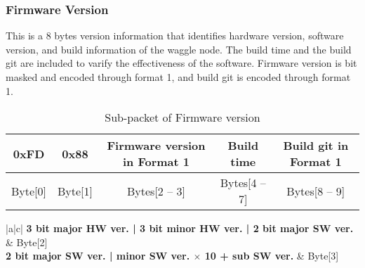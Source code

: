 \subsubsection{Firmware Version}
This is a 8 bytes version information that identifies hardware version, software version, and build information of the waggle node.
The build time and the build git are included to varify the effectiveness of the software.
Firmware version is bit masked and encoded through format 1, and build git is encoded through format 1.

\begin{table}[h!]
    \centering
    \caption{Sub-packet of Firmware version}
    \begin{tabular}{|c|c|c|c|c|}
        \hline
        \rowcolor{black!8}
        \textbf{0xFD} & \textbf{0x88} & \textbf{Firmware version in Format 1} & \textbf{Build time} & \textbf{Build git in Format 1} \\ \hline
        Byte[0] & Byte[1] & Bytes[2 -- 3] & Bytes[4 -- 7] & Bytes[8 -- 9]\\ \hline
    \end{tabular}
\end{table}


\begin{table}[h!]
    \centering
    \caption{Firmware version}
    \begin{tabular}{|a|c|}
        \hline
        \textbf{3 bit major HW ver. | 3 bit minor HW ver. | 2 bit major SW ver.} & Byte[2] \\ \hline
        \textbf{2 bit major SW ver. | minor SW ver. $\times$ 10 + sub SW ver.} & Byte[3]\\ \hline
    \end{tabular}
\end{table}
